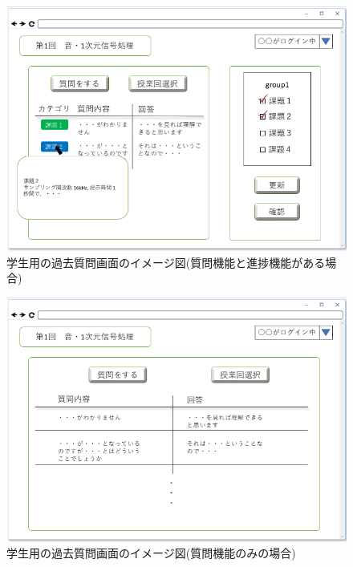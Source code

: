 \begin{figure}[phtbp]
  \begin{center}
    \includegraphics[width=0.5\linewidth,clip]{./img/34.png}
    \caption{学生用の過去質問画面のイメージ図(質問機能と進捗機能がある場合)}\label{fig:34}
  \end{center}
\end{figure}

\begin{figure}[phtbp]
  \begin{center}
    \includegraphics[width=0.5\linewidth,clip]{./img/35.png}
    \caption{学生用の過去質問画面のイメージ図(質問機能のみの場合)}\label{fig:35}
  \end{center}
\end{figure}


